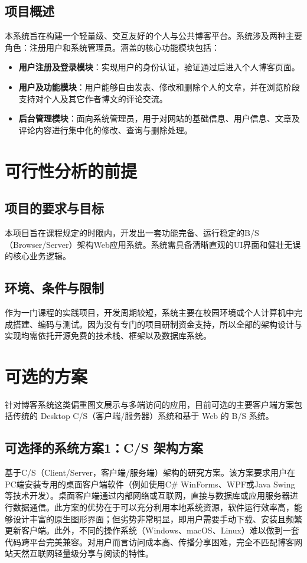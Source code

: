 \documentclass[12pt, a4paper]{ctexart}
\begin{document}
\subsection{项目概述}
本系统旨在构建一个轻量级、交互友好的个人与公共博客平台。系统涉及两种主要角色：注册用户和系统管理员。涵盖的核心功能模块包括：
\begin{itemize}
    \item \textbf{用户注册及登录模块}：实现用户的身份认证，验证通过后进入个人博客页面。
    \item \textbf{用户及功能模块}：用户能够自由发表、修改和删除个人的文章，并在浏览阶段支持对个人及其它作者博文的评论交流。
    \item \textbf{后台管理模块}：面向系统管理员，用于对网站的基础信息、用户信息、文章及评论内容进行集中化的修改、查询与删除处理。
\end{itemize}

\section{可行性分析的前提}
\subsection{项目的要求与目标}
本项目旨在课程规定的时限内，开发出一套功能完备、运行稳定的B/S（Browser/Server）架构Web应用系统。系统需具备清晰直观的UI界面和健壮无误的核心业务逻辑。

\subsection{环境、条件与限制}
作为一门课程的实践项目，开发周期较短，系统主要在校园环境或个人计算机中完成搭建、编码与测试。因为没有专门的项目研制资金支持，所以全部的架构设计与实现均需依托开源免费的技术栈、框架以及数据库系统。

\section{可选的方案}
针对博客系统这类偏重图文展示与多端访问的应用，目前可选的主要客户端方案包括传统的 Desktop C/S（客户端/服务器）系统和基于 Web 的 B/S 系统。

\subsection{可选择的系统方案1：C/S 架构方案}
基于C/S（Client/Server，客户端/服务端）架构的研究方案。该方案要求用户在PC端安装专用的桌面客户端软件（例如使用C\# WinForms、WPF或Java Swing等技术开发）。桌面客户端通过内部网络或互联网，直接与数据库或应用服务器进行数据通信。此方案的优势在于可以充分利用本地系统资源，软件运行效率高，能够设计丰富的原生图形界面；但劣势非常明显，即用户需要手动下载、安装且频繁更新客户端。此外，不同的操作系统（Windows、macOS、Linux）难以做到一套代码跨平台完美兼容。对用户而言访问成本高、传播分享困难，完全不匹配博客网站天然互联网轻量级分享与阅读的特性。
\end{document}
